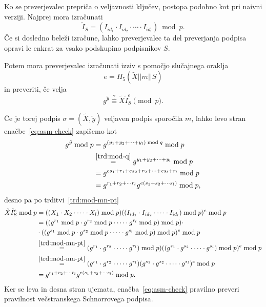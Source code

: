 \documentclass[isrm2, tisk]{fmfdelo}
\begin{document}
Ko se preverjevalec prepriča o veljavnosti ključev, postopa podobno kot pri naivni verziji. Najprej
mora izračunati
$$
\tilde{I}_S = (I_{id_1} \cdot I_{id_2} \cdot \cdots \cdot I_{id_l}) \bmod p.
$$
Če si dosledno beleži izračune, lahko preverjevalec ta del preverjanja podpisa opravi le enkrat za
vsako podskupino podpisnikov $S$.

Potem mora preverjevalec izračunati izziv s pomočjo slučajnega oraklja
$$
e = H_5(\tilde{X} || m || S)
$$
in preveriti, če velja
\begin{equation}
\label{eq:asm-check}
g^{\tilde{y}} \stackrel{?}{\equiv} \tilde{X} \tilde{I}_S^e \pmod p.
\end{equation}

Če je torej podpis $\sigma = (\tilde{X}, \tilde{y})$ veljaven podpis sporočila $m$, lahko levo stran
enačbe~\eqref{eq:asm-check} zapišemo kot
\begin{align*}
    g^{\tilde{y}} \bmod p &= g^{(y_1 + y_2 + \cdots + y_l) \bmod q} \bmod p \\
                          &\stackrel{\ref{trd:mod-q}}{=} g^{y_1 + y_2 + \cdots + y_l} \bmod p \\
                          &= g^{e s_1 + r_1 + e s_2 + r_2 + \cdots + e s_l + r_l} \bmod p \\
                          &= g^{r_1 + r_2 + \cdots r_l} g^{e (s_1 + s_2 + \cdots s_l)} \bmod p,
\end{align*}
desno pa po trditvi~\ref{trd:mod-mn-pt}
\begin{align*}
    \tilde{X} \tilde{I}_S^e \bmod p &= ((X_1 \cdot X_2 \cdot \cdots \cdot X_l) \bmod p)
        ((I_{id_1} \cdot I_{id_2} \cdot \cdots \cdot I_{id_l}) \bmod p)^e \bmod p \\
    &=((g^{r_1} \bmod p \cdot g^{r_2} \bmod p \cdot \cdots \cdot g^{r_l} \bmod p) \bmod p) \cdot \\
    &\cdot ((g^{s_1} \bmod p \cdot g^{s_2} \bmod p \cdot \cdots \cdot g^{s_l} \bmod p) \bmod p)^e \bmod p \\
    &\stackrel{\ref{trd:mod-mn-pt}}{=} (g^{r_1} \cdot g^{r_2} \cdot \cdots \cdot g^{r_l}) \bmod p) 
        ((g^{s_1} \cdot g^{s_2} \cdot \cdots \cdot g^{s_l}) \bmod p)^e \bmod p \\
    &\stackrel{\ref{trd:mod-mn-pt}}{=} (g^{r_1} \cdot g^{r_2} \cdot \cdots \cdot g^{r_l}) 
        (g^{s_1} \cdot g^{s_2} \cdot \cdots \cdot g^{s_l})^e \bmod p \\
    &= g^{r_1 + r_2 + \cdots r_l} g^{e (s_1 + s_2 + \cdots s_l)} \bmod p.
\end{align*}
Ker se leva in desna stran ujemata, enačba~\eqref{eq:asm-check} pravilno preveri pravilnost večstranskega
Schnorrovega podpisa.
\end{document}
